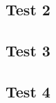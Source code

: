 \documentclass{article}
\begin{document}
\subsection{Test 2}
    \begin{center}
    \end{center}
\subsection{Test 3}
    \begin{center}
    \end{center}
\subsection{Test 4}
    \begin{center}
    \end{center}
\end{document}
